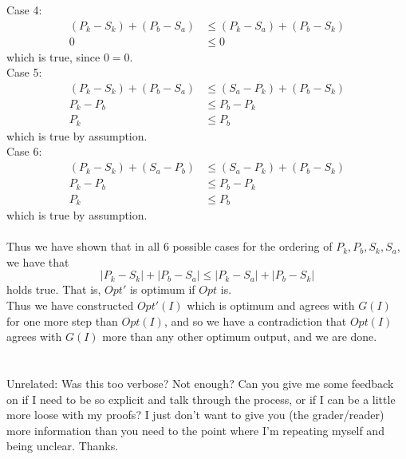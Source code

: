 \documentclass[11pt]{article}
\begin{document}
Case 4:
\begin{align*}
(P_k - S_k) + (P_b - S_a) &\le (P_k - S_a) + (P_b - S_k)\\
0 &\le 0
\end{align*}
which is true, since $0 = 0$.\\

Case 5:
\begin{align*}
(P_k - S_k) + (P_b - S_a) &\le (S_a - P_k) + (P_b - S_k)\\
P_k - P_b &\le P_b - P_k\\
P_k &\le P_b
\end{align*}
which is true by assumption.\\

Case 6:
\begin{align*}
(P_k - S_k) + (S_a - P_b) &\le (S_a - P_k) + (P_b - S_k)\\
P_k - P_b &\le P_b - P_k\\
P_k &\le P_b
\end{align*}
which is true by assumption.\\
\\
Thus we have shown that in all 6 possible cases for the ordering of $P_k, P_b, S_k, S_a$, we have that 
\[
|P_k - S_k| + |P_b - S_a| \le |P_k - S_a| + |P_b - S_k|
\]
holds true. That is, $Opt'$ is optimum if $Opt$ is.\\
Thus we have constructed $Opt'(I)$ which is optimum and agrees with $G(I)$ for one more step than $Opt(I)$, and so we have a contradiction that $Opt(I)$ agrees with $G(I)$ more than any other optimum output, and we are done.\\
\\
\\
Unrelated: Was this too verbose? Not enough? Can you give me some feedback on if I need to be so explicit and talk through the process, or if I can be a little more loose with my proofs? I just don't want to give you (the grader/reader) more information than you need to the point where I'm repeating myself and being unclear. Thanks.
\end{document}
